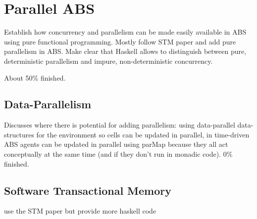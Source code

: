 \chapter{Parallel ABS}
\label{ch:parallel_abs}

Establish how concurrency and parallelism can be made easily available in ABS using pure functional programming. Mostly follow STM paper and add pure parallelism in ABS. Make clear that Haskell allows to distinguish between pure, deterministic parallelism and impure, non-deterministic concurrency.

About 50\% finished.

\section{Data-Parallelism}
Discusses where there is potential for adding parallelism: using data-parallel data-structures for the environment so cells can be updated in parallel, in time-driven ABS agents can be updated in parallel using parMap because they all act conceptually at the same time (and if they don't run in monadic code). 0\% finished.

\section{Software Transactional Memory}
use the STM paper but provide more haskell code